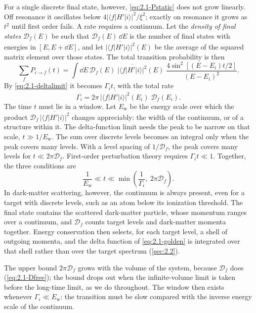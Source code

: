 For a single discrete final state, however, \cref{eq:2.1-Pstatic} does not grow linearly. Off resonance it oscillates below $4|\langle f|H'|i\rangle|^2/\xi^2$; exactly on resonance it grows as $t^2$ until first order fails. A rate requires a continuum. Let the \emph{density of final states} $\mathcal{D}_f(E)$ be such that $\mathcal{D}_f(E)\,\dd E$ is the number of final states with energies in $[E, E + \dd E]$, and let $\overline{|\langle f|H'|i\rangle|^2}(E)$ be the average of the squared matrix element over those states. The total transition probability is then
\begin{equation*}
  \sum_f P_{i\to f}(t) = \int\dd E\,\mathcal{D}_f(E)\;\overline{|\langle f|H'|i\rangle|^2}(E)\;\frac{4\sin^2[(E - E_i)t/2]}{(E - E_i)^2} .
\end{equation*}
By \cref{eq:2.1-deltalimit} it becomes $\varGamma_i t$, with the total rate
\begin{equation}
  \varGamma_i = 2\pi\,\overline{|\langle f|H'|i\rangle|^2}(E_i)\;\mathcal{D}_f(E_i) .
  \label{eq:2.1-total}
\end{equation}
The time $t$ must lie in a window. Let $E_{\mathrm{w}}$ be the energy scale over which the product $\mathcal{D}_f\,\overline{|\langle f|H'|i\rangle|^2}$ changes appreciably: the width of the continuum, or of a structure within it. The delta-function limit needs the peak to be narrow on that scale, $t \gg 1/E_{\mathrm{w}}$. The sum over discrete levels becomes an integral only when the peak covers many levels. With a level spacing of $1/\mathcal{D}_f$, the peak covers many levels for $t \ll 2\pi\mathcal{D}_f$. First-order perturbation theory requires $\varGamma_i t \ll 1$. Together, the three conditions are
\begin{equation}
  \frac{1}{E_{\mathrm{w}}} \ll t \ll \min\!\left(\frac{1}{\varGamma_i},\; 2\pi\mathcal{D}_f\right).
  \label{eq:2.1-window}
\end{equation}
In dark-matter scattering, however, the continuum is always present, even for a target with discrete levels, such as an atom below its ionization threshold. The final state contains the scattered dark-matter particle, whose momentum ranges over a continuum, and $\mathcal{D}_f$ counts target levels and dark-matter momenta together. Energy conservation then selects, for each target level, a shell of outgoing momenta, and the delta function of \cref{eq:2.1-golden} is integrated over that shell rather than over the target spectrum (\cref{sec:2.2}).

The upper bound $2\pi\mathcal{D}_f$ grows with the volume of the system, because $\mathcal{D}_f$ does (\cref{eq:2.1-Dfree}); the bound drops out when the infinite-volume limit is taken before the long-time limit, as we do throughout. The window then exists whenever $\varGamma_i \ll E_{\mathrm{w}}$: the transition must be slow compared with the inverse energy scale of the continuum.

